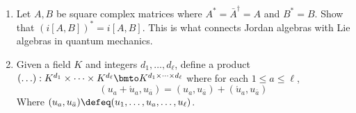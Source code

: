 \begin{enumerate}
\item Let $A,B$ be square complex matrices where $A^*=\bar{A}^{\dagger}=A$ and 
$B^*=B$.  Show that $(i[A,B])^*=i[A,B]$.  This is what connects Jordan algebras 
with Lie algebras in quantum mechanics.

\item Given a field $K$ and integers $d_1,\ldots,d_{\ell}$, define a 
product $(\ldots):K^{d_1}\times \cdots \times K^{d_{\ell}}\bmto K^{d_1\times \cdots\times d_{\ell}}$
where for each $1\leq a\leq \ell$,
\[
    (u_a+\acute{u}_a, u_{\bar{a}})  = (u_a,u_{\bar{a}})+(\acute{u}_a,u_{\bar{a}})
\]
Where $(u_a,u_{\bar{a}})\defeq (u_1,\ldots, u_{a}, \ldots, u_{\ell})$.
\end{enumerate}